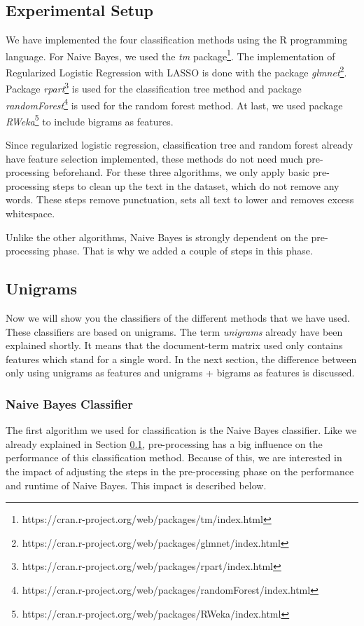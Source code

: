 \documentclass[a4paper,11pt]{article}
\begin{document}
\subsection{Experimental Setup}
\label{section:expSetup}
We have implemented the four classification methods using the R programming language. For Naive Bayes, we used the \textit{tm} package\footnote{https://cran.r-project.org/web/packages/tm/index.html}. The implementation of Regularized Logistic Regression with LASSO is done with the package \textit{glmnet}\footnote{https://cran.r-project.org/web/packages/glmnet/index.html}. Package \textit{rpart}\footnote{https://cran.r-project.org/web/packages/rpart/index.html} is used for the classification tree method and package \textit{randomForest}\footnote{https://cran.r-project.org/web/packages/randomForest/index.html} is used for the random forest method. At last, we used package \textit{RWeka}\footnote{https://cran.r-project.org/web/packages/RWeka/index.html} to include bigrams as features.

Since regularized logistic regression, classification tree and random forest already have feature selection implemented, these methods do not need much pre-processing beforehand. For these three algorithms, we only apply basic pre-processing steps to clean up the text in the dataset, which do not remove any words. These steps remove punctuation, sets all text to lower and removes excess whitespace.

Unlike the other algorithms, Naive Bayes is strongly dependent on the pre-processing phase. That is why we added a couple of steps in this phase.


\subsection{Unigrams}
Now we will show you the classifiers of the different methods that we have used. These classifiers are based on unigrams. The term \textit{unigrams} already have been explained shortly. It means that the document-term matrix used only contains features which stand for a single word. In the next section, the difference between only using unigrams as features and unigrams + bigrams as features is discussed.

\subsubsection{Naive Bayes Classifier}
The first algorithm we used for classification is the Naive Bayes classifier. Like we already explained in Section \ref{section:expSetup}, pre-processing has a big influence on the performance of this classification method. Because of this, we are interested in the impact of adjusting the steps in the pre-processing phase on the performance and runtime of Naive Bayes. This impact is described below.
\end{document}
